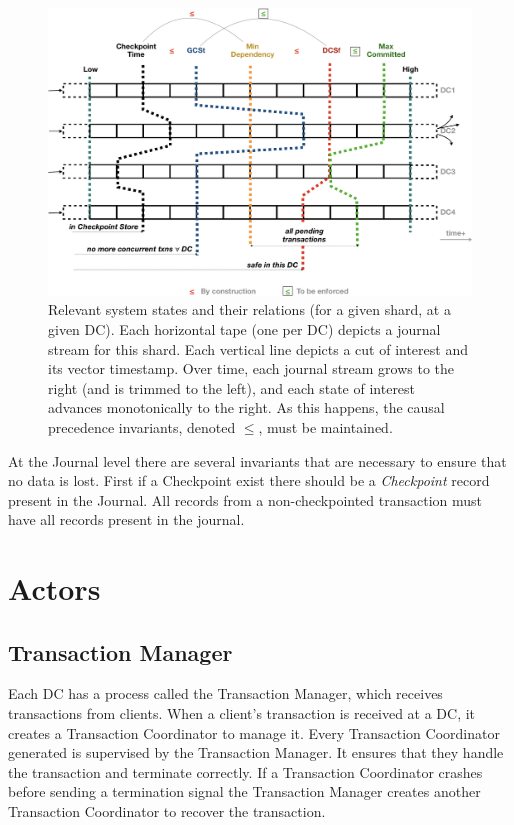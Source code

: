 \documentclass[twoside]{article}
\begin{document}
\begin{figure}[tp]
  \centering
  \includegraphics[width=\textwidth]{figures/cvts.png}
  \caption{%
    Relevant system states and their relations (for a given
    shard, at a given DC).
    Each horizontal tape (one per DC) depicts a journal stream for
    this shard.
    Each vertical line depicts a cut of interest and its
    vector timestamp.
    Over time, each journal stream grows to the right (and is
    trimmed to the left), and each state of interest advances
    monotonically to the right.
    As this happens, the causal precedence invariants, denoted
    $\le$, must be maintained.
  }
  \label{fig:system-vts}
\end{figure}

At the Journal level there are several invariants that are necessary to ensure that
no data is lost.
First if a Checkpoint exist there should be a \textit{Checkpoint} record present in
the Journal.
All records from a non-checkpointed transaction must have all records 
present in the journal.

\section{Actors}
\subsection{Transaction Manager}
\label{sec:transaction-daemon}

Each DC has a process called the Transaction Manager, which 
receives transactions from clients.
When a client's transaction is received at a DC, it creates a Transaction
Coordinator to manage it.
Every Transaction Coordinator generated is supervised by the Transaction Manager. 
It ensures that they handle the transaction and terminate correctly.
If a Transaction Coordinator crashes before sending a termination 
signal the Transaction Manager creates another Transaction 
Coordinator to recover the transaction.
\end{document}

